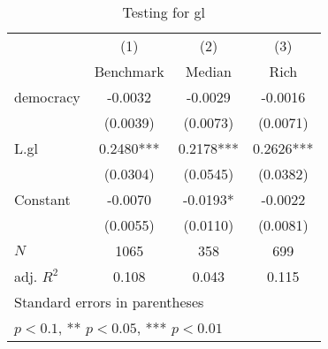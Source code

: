 \begin{table}[htbp]\centering
\def\sym#1{\ifmmode^{#1}\else\(^{#1}\)\fi}
\caption{Testing for gl \label{tab:regression3}}
\begin{tabular}{l*{3}{c}}
\hline\hline
            &\multicolumn{1}{c}{(1)}&\multicolumn{1}{c}{(2)}&\multicolumn{1}{c}{(3)}\\
            &\multicolumn{1}{c}{Benchmark}&\multicolumn{1}{c}{Median}&\multicolumn{1}{c}{Rich}\\
\hline
democracy   &     -0.0032   &     -0.0029   &     -0.0016   \\
            &    (0.0039)   &    (0.0073)   &    (0.0071)   \\
[1em]
L.gl        &      0.2480***&      0.2178***&      0.2626***\\
            &    (0.0304)   &    (0.0545)   &    (0.0382)   \\
[1em]
Constant    &     -0.0070   &     -0.0193*  &     -0.0022   \\
            &    (0.0055)   &    (0.0110)   &    (0.0081)   \\
\hline
\(N\)       &        1065   &         358   &         699   \\
adj. \(R^{2}\)&       0.108   &       0.043   &       0.115   \\
\hline\hline
\multicolumn{4}{l}{\footnotesize Standard errors in parentheses}\\
\multicolumn{4}{l}{\footnotesize * \(p<0.1\), ** \(p<0.05\), *** \(p<0.01\)}\\
\end{tabular}
\end{table}

